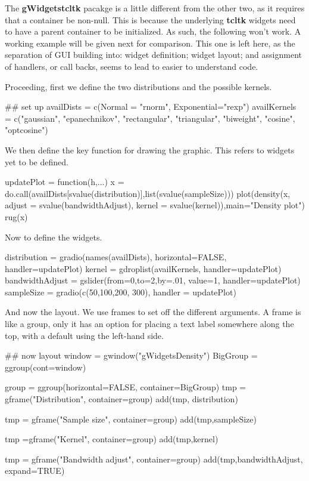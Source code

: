 \documentclass[12pt]{article}
\newcommand{\RPackage}[1]{\textbf{#1}}
\begin{document}
The \RPackage{gWidgetstcltk} pacakge is a little different from the
other two, as it requires that a container be non-null. This is
because the underlying \RPackage{tcltk} widgets need to have a parent
container to be initialized. As such, the following won't work. A
working example will be given next for comparison. This one is left
here, as the separation  of GUI building into: widget definition;
widget layout; and assignment of handlers, or call backs, seems to
lead to easier to understand code.

Proceeding, first we define the two distributions and the possible kernels.
\begin{Scode}
## set up
availDists = c(Normal = "rnorm", Exponential="rexp")
availKernels = c("gaussian", "epanechnikov", "rectangular",
"triangular", "biweight", "cosine", "optcosine")
\end{Scode}

We then define the key function for drawing the graphic. This refers
to widgets yet to be defined.
                      
\begin{Scode}
updatePlot = function(h,...) {
  x = do.call(availDists[svalue(distribution)],list(svalue(sampleSize)))
  plot(density(x, adjust = svalue(bandwidthAdjust), kernel = svalue(kernel)),main="Density plot")
  rug(x)
}
\end{Scode}
Now to define the widgets.
\begin{Scode}
distribution = gradio(names(availDists), horizontal=FALSE, handler=updatePlot)
kernel = gdroplist(availKernels, handler=updatePlot)
bandwidthAdjust = gslider(from=0,to=2,by=.01, value=1, handler=updatePlot)
sampleSize = gradio(c(50,100,200, 300), handler = updatePlot)
\end{Scode}

And now the layout. We use frames to set off the different
arguments. A frame is like a group, only it has an option for placing
a text label somewhere along the top, with a default using the left-hand
side.
\begin{Scode}
## now layout
window = gwindow("gWidgetsDensity")
BigGroup = ggroup(cont=window)

group = ggroup(horizontal=FALSE, container=BigGroup)
tmp = gframe("Distribution", container=group)
add(tmp, distribution)

tmp  = gframe("Sample  size", container=group)
add(tmp,sampleSize)

tmp =gframe("Kernel", container=group)
add(tmp,kernel)

tmp = gframe("Bandwidth adjust", container=group)
add(tmp,bandwidthAdjust, expand=TRUE)
\end{Scode}
\end{document}
